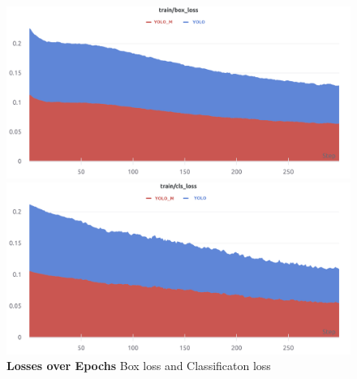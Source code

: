

\begin{figure}
    \centering
    \begin{minipage}{0.48\textwidth}
        \centering
  \includegraphics[width=\textwidth]{figures/paper/box-loss.png}
    \end{minipage}\hfill
    \begin{minipage}{0.48\textwidth}
        \centering
  \includegraphics[width=\textwidth]{figures/paper/cls-loss.png}
    \end{minipage}
    \caption[Box loss and Classificaton loss]{\textbf{Losses over Epochs} Box loss and Classificaton loss }
  \label{fig:figures/paper/box-loss}
\end{figure}






